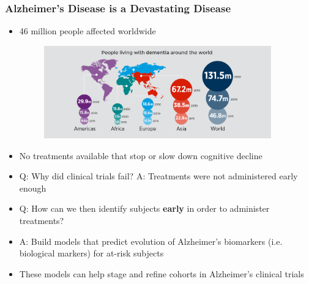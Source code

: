 \documentclass[8pt,xcolor=table,aspectratio=169]{beamer}
\begin{document}
\begin{frame}
\frametitle{Alzheimer's Disease is a Devastating Disease}

\vspace{-1em}
\begin{itemize}
 \item 46 million people affected worldwide
 
  \begin{figure}
 \centering
  \includegraphics[height=4cm]{adPrevalanceIncreasing}
 \end{figure}
 
  \item No treatments available that stop or slow down cognitive decline
  \item Q: Why did clinical trials fail? A: Treatments were not administered early enough 
 \vspace{1em}
  \item Q: How can we then identify subjects \textbf{early} in order to administer treatments? 
  \item A: Build models that predict evolution of Alzheimer's biomarkers (i.e. biological markers) for at-risk subjects
  \vspace{1em}
  \item These models can help stage and refine cohorts in Alzheimer's clinical trials

\end{itemize}

\vspace{-1em}

\end{frame}
\end{document}
